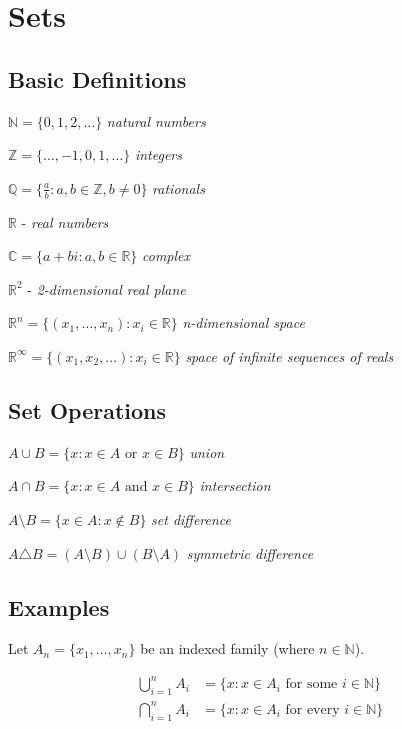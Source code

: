 \documentclass[12pt,a4paper]{article}
\begin{document}
\section{Sets}

\subsection{Basic Definitions}

$\mathbb{N} = \{0,1,2,\ldots\}$ \textit{natural numbers}

$\mathbb{Z} = \{\ldots,-1,0,1,\ldots\}$ \textit{integers}

$\mathbb{Q} = \{\frac{a}{b} : a,b \in \mathbb{Z}, b \neq 0\}$ \textit{rationals}

$\mathbb{R}$ - \textit{real numbers}

$\mathbb{C} = \{a+bi : a,b \in \mathbb{R}\}$ \textit{complex}

$\mathbb{R}^2$ - \textit{2-dimensional real plane}

$\mathbb{R}^n = \{(x_1,\ldots,x_n) : x_i \in \mathbb{R}\}$ \textit{n-dimensional space}

$\mathbb{R}^\infty = \{(x_1,x_2,\ldots) : x_i \in \mathbb{R}\}$ \textit{space of infinite sequences of reals}

\subsection{Set Operations}

$A \cup B = \{x : x \in A \text{ or } x \in B\}$ \textit{union}

$A \cap B = \{x : x \in A \text{ and } x \in B\}$ \textit{intersection}

$A \setminus B = \{x \in A : x \notin B\}$ \textit{set difference}

$A \triangle B = (A \setminus B) \cup (B \setminus A)$ \textit{symmetric difference}

\subsection{Examples}

Let $A_n = \{x_1,\ldots,x_n\}$ be an indexed family (where $n \in \mathbb{N}$).

\begin{align*}
\bigcup_{i=1}^n A_i &= \{x : x \in A_i \text{ for some } i \in \mathbb{N}\} \\
\bigcap_{i=1}^n A_i &= \{x : x \in A_i \text{ for every } i \in \mathbb{N}\}
\end{align*}
\end{document}
